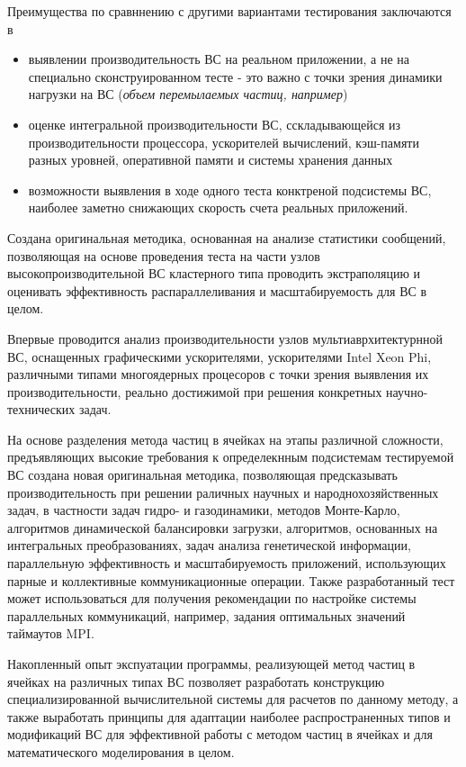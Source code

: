 Преимущества по сравннению с другими вариантами тестирования заключаются в
\begin{itemize}
	\item выявлении производительность ВС на реальном приложении, а не на специально сконструированном тесте - это важно с точки зрения динамики нагрузки на ВС (\textit{объем перемылаемых частиц, например})
	
	\item оценке интегральной производительности ВС, сскладывающейся из производительности процессора, ускорителей вычислений, кэш-памяти разных уровней, оперативной памяти и системы хранения данных
	\item возможности выявления в ходе одного теста конктреной подсистемы ВС, наиболее заметно снижающих скорость счета реальных приложений. 
	
\end{itemize}
Создана оригинальная методика, основанная на анализе статистики сообщений, позволяющая на основе проведения теста на части узлов высокопроизводительной ВС кластерного типа проводить экстраполяцию и оценивать эффективность распараллеливания и масштабируемость для ВС в целом.

Впервые проводится анализ производительности узлов мультиаврхитектурнной ВС, оснащенных графическими ускорителями, ускорителями Intel Xeon Phi, различными типами многоядерных процесоров с точки зрения выявления их производительности, реально достижимой при решения конкретных научно-технических задач.

На основе разделения метода частиц в ячейках на этапы различной сложности, предъявляющих высокие требования к определекнным подсистемам тестируемой ВС создана новая оригинальная методика, позволяющая предсказывать производительность при решении раличных научных и народнохозяйственных задач, в частности задач гидро- и газодинамики, методов Монте-Карло, алгоритмов динамической балансировки загрузки, алгоритмов, основанных на интегральных преобразованиях, задач анализа генетической информации, параллельную эффективность и масштабируемость приложений, использующих парные и коллективные коммуникационные операции. Также разработанный тест может использоваться для получения рекомендации по настройке системы параллельных коммуникаций, например, задания оптимальных значений таймаутов MPI.


{\influence} Накопленный опыт экспуатации программы, реализующей метод частиц в ячейках на различных типах ВС позволяет разработать конструкцию специализированной вычислительной системы для расчетов по данному методу, а также выработать принципы для адаптации наиболее распространенных типов и модификаций ВС для эффективной работы с методом частиц в ячейках и для математического моделирования в целом.

